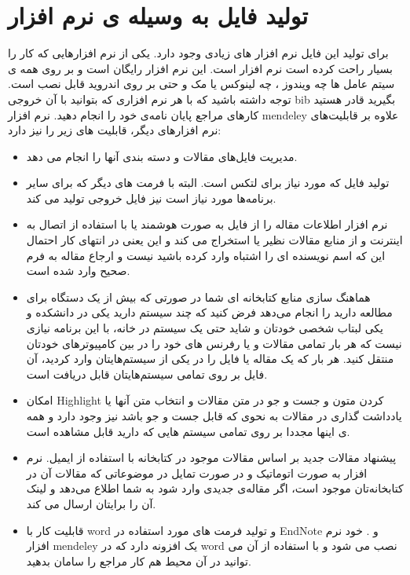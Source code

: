 \section{تولید فایل به وسیله ی نرم افزار}
برای تولید این فایل نرم افزار های زیادی وجود دارد. یکی از نرم افزار‌هایی که کار را بسیار راحت کرده است نرم افزار 
است. این نرم افزار  رایگان است و بر روی همه ی  سیتم عامل ها چه ویندوز ، چه لینوکس یا مک و حتی بر روی اندروید قابل نصب است. توجه داشته باشید که با هر نرم افزاری که بتوانید با آن خروجی bib بگیرید قادر هستید کارهای مراجع پایان نامه‌ی خود را انجام دهید. نرم افزار mendeley علاوه بر قابلیت‌های نرم افزار‌های دیگر، قابلیت های زیر را نیز دارد:
\begin{itemize}
	\item مدیریت فایل‌های مقالات و دسته بندی آنها را انجام می دهد.
	\item تولید فایل  که مورد نیاز برای لتکس است. البته با فرمت های دیگر که برای سایر برنامه‌ها مورد نیاز است نیز فایل خروجی تولید می کند.
	\item نرم افزار اطلاعات مقاله را از فایل   به صورت هوشمند یا با استفاده از اتصال به اینترنت و از منابع مقالات نظیر  یا  استخراج می کند و این یعنی در انتهای کار احتمال این که اسم نویسنده ای را اشتباه وارد کرده باشید نیست و ارجاع مقاله به فرم صحیح وارد شده است.
	\item هماهنگ سازی منابع کتابخانه ای شما در صورتی که بیش از یک دستگاه برای مطالعه دارید را انجام می‌دهد فرض کنید که چند سیستم دارید یکی در دانشکده و یکی لبتاب شخصی خودتان و شاید حتی یک سیستم در خانه، با این برنامه نیازی نیست که هر بار تمامی مقالات و یا رفرنس های خود را در بین کامپیوتر‌های خودتان منتقل کنید. هر بار که یک مقاله یا فایل را در یکی از سیستم‌هایتان وارد کردید، آن فایل بر روی تمامی سیستم‌هایتان قابل دریافت است.
	\item  امکان Highlight کردن متون و جست و جو در متن مقالات و انتخاب متن آنها یا یادداشت گذاری در مقالات به نحوی که قابل جست و جو باشد نیز وجود دارد و همه ی اینها مجددا بر روی تمامی سیستم هایی که دارید قابل مشاهده است. 
	\item پیشنهاد مقالات جدید بر اساس مقالات موجود در کتابخانه با استفاده از ایمیل. نرم افزار به صورت اتوماتیک و در صورت تمایل در موضوعاتی که مقالات آن در کتابخانه‌تان موجود است، اگر مقاله‌ی جدیدی وارد شود به شما اطلاع می‌دهد و لینک آن را برایتان ارسال می کند.
	\item  قابلیت کار با word و تولید فرمت های مورد استفاده در EndNote و . خود نرم افزار mendeley یک افزونه دارد که در word نصب می شود و با استفاده از آن می توانید در آن محیط هم کار مراجع را سامان بدهید.
\end{itemize}

